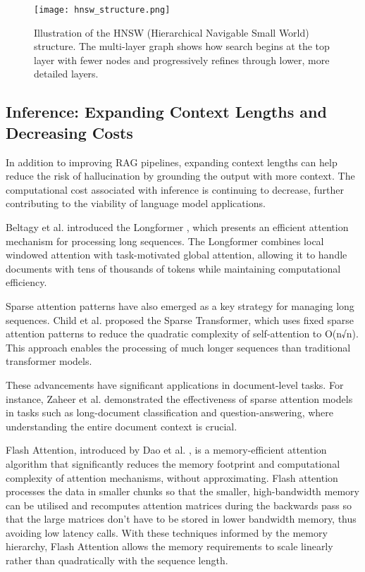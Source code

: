 \documentclass[a4paper, oneside]{discothesis}
\begin{document}
\begin{figure}[h]
\centering
\texttt{[image: hnsw\_structure.png]}
\caption{Illustration of the HNSW (Hierarchical Navigable Small World) structure. The multi-layer graph shows how search begins at the top layer with fewer nodes and progressively refines through lower, more detailed layers.}
\label{fig:hnsw_structure}
\end{figure}

\subsection{Inference: Expanding Context Lengths and Decreasing Costs}
In addition to improving RAG pipelines, expanding context lengths can help reduce the risk of hallucination by grounding the output with more context. The computational cost associated with inference is continuing to decrease, further contributing to the viability of language model applications. 

Beltagy et al. introduced the Longformer \cite{beltagy2020longformer}, which presents an efficient attention mechanism for processing long sequences. The Longformer combines local windowed attention with task-motivated global attention, allowing it to handle documents with tens of thousands of tokens while maintaining computational efficiency.

Sparse attention patterns have also emerged as a key strategy for managing long sequences. Child et al. \cite{child2019generating} proposed the Sparse Transformer, which uses fixed sparse attention patterns to reduce the quadratic complexity of self-attention to O(n√n). This approach enables the processing of much longer sequences than traditional transformer models.

These advancements have significant applications in document-level tasks. For instance, Zaheer et al. \cite{zaheer2020big} demonstrated the effectiveness of sparse attention models in tasks such as long-document classification and question-answering, where understanding the entire document context is crucial.

Flash Attention, introduced by Dao et al. \cite{dao2022flashattention}, is a memory-efficient attention algorithm that significantly reduces the memory footprint and computational complexity of attention mechanisms, without approximating. Flash attention processes the data in smaller chunks so that the smaller, high-bandwidth memory can be utilised and recomputes attention matrices during the backwards pass so that the large matrices don't have to be stored in lower bandwidth memory, thus avoiding low latency calls. With these techniques informed by the memory hierarchy, Flash Attention allows the memory requirements to scale linearly rather than quadratically with the sequence length. 
\end{document}
